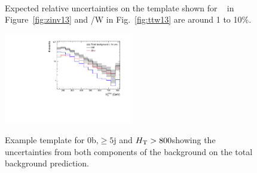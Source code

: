 \begin{figure}[h!]
  \centering
  ~~
  \\
  \caption{\label{fig:expected13} Expected relative uncertainties on the template shown for \zInv~ in Figure~\ref{fig:zinv13} 
  and \ttbar/W in Fig.~\ref{fig:ttw13} are around 1 to 10\%.}
  
\end{figure}

\begin{figure}[h!]
  \centering
  \includegraphics[width=0.5\textwidth]{figures/template/exampleTemplate13TeV.pdf}
  \\
  \caption{\label{fig:exampleTemplate13} Example template for 0b,$\ge5$j and $\mbox{$H_\text{T}$} > 800$\GeV showing the uncertainties from both
components of the background on the total background prediction.}
  
\end{figure}
